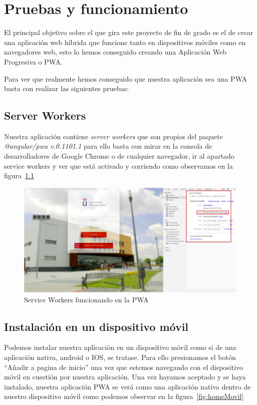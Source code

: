 \documentclass[a4paper, 12pt]{book}
\begin{document}

\cleardoublepage
\chapter{Pruebas y funcionamiento}

El principal objetivo sobre el que gira este proyecto de fin de grado es el de crear una aplicación web híbrida que funcione tanto en dispositivos móviles como en navegadores web, esto lo hemos conseguido creando una Aplicación Web Progresiva o PWA. 

Para ver que realmente hemos conseguido que nuestra aplicación sea una PWA basta con realizar las siguientes pruebas: 

\section{Server Workers}
Nuestra aplicación contiene \textit{server workers} que son propios del paquete \textit{@angular/pwa v.0.1101.1} para ello basta con mirar en la consola de desarrolladores de Google Chrome o de cualquier navegador, ir al apartado service workers y ver que está activado y corriendo como observamos en la figura~\ref{fig:serviceWorker}
	
	\begin{figure}
  	\centering
  	\includegraphics[width=16cm, keepaspectratio]{img/principalWorker.png}
  	\caption{Service Workers funcionando en la PWA}\label{fig:serviceWorker}
	\end{figure}
	  
\section{Instalación en un dispositivo móvil}
Podemos instalar nuestra aplicación en un dispositivo móvil como si de una aplicación nativa, android o IOS, se tratase. Para ello presionamos el botón ``Añadir a pagina de inicio'' una vez que estemos navegando con el dispositivo móvil en cuestión por nuestra aplicación.
	Una vez hayamos aceptado y se haya instalado, nuestra aplicación PWA se verá como una aplicación nativa dentro de nuestro dispositivo móvil como podemos observar en la figura~\ref{fig:homeMovil} 
 
\end{document}

